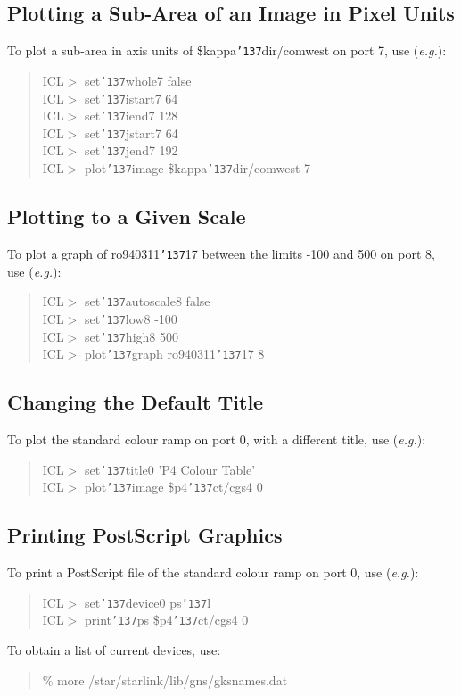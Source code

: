 \documentclass[a4paper]{book}
\renewcommand{\_}{{\tt\char'137}}
\begin{document}
\subsection{Plotting a Sub-Area of an Image in Pixel Units}
To plot a sub-area in axis units of {\sc \$kappa\_dir/}comwest on port
7, use ({\em e.g.}):

\begin{quote}
ICL$>$ set\_whole7 false \\
ICL$>$ set\_istart7 64 \\
ICL$>$ set\_iend7 128 \\
ICL$>$ set\_jstart7 64 \\
ICL$>$ set\_jend7 192 \\
ICL$>$ plot\_image {\sc \$kappa\_dir/}comwest 7
\end{quote}

\subsection{Plotting to a Given Scale}
To plot a graph of ro940311\_17 between the limits -100 and 500 on port
8, use ({\em e.g.}):

\begin{quote}
ICL$>$ set\_autoscale8 false \\
ICL$>$ set\_low8 -100 \\
ICL$>$ set\_high8 500 \\
ICL$>$ plot\_graph ro940311\_17 8
\end{quote}
\subsection{Changing the Default Title}
To plot the standard colour ramp on port 0, with a different title, use ({\em e.g.}):
\begin{quote}
ICL$>$ set\_title0 'P4 Colour Table' \\
ICL$>$ plot\_image {\sc \$p4\_ct/}cgs4 0
\end{quote}
\subsection{Printing PostScript Graphics}
To print a PostScript file of the standard colour ramp on port 0,
use ({\em e.g.}):
\begin{quote}
ICL$>$ set\_device0 ps\_l \\
ICL$>$ print\_ps {\sc \$p4\_ct/}cgs4 0
\end{quote}
To obtain a list of current devices, use:
\begin{quote}
 \% more /star/starlink/lib/gns/gksnames.dat
\end{quote}
\end{document}
